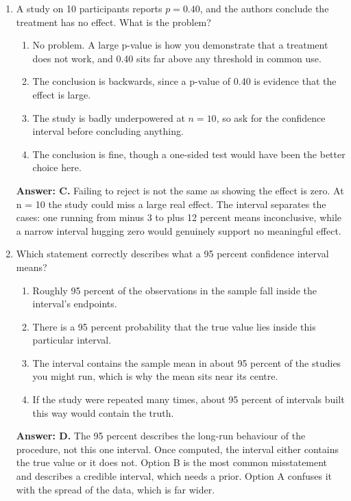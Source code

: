\documentclass[11pt]{article}
\begin{document}
\begin{enumerate}[itemsep=14pt]
\item A study on 10 participants reports $p = 0.40$, and the authors conclude the treatment has no effect. What is the problem?

\begin{enumerate}[label=\Alph*., itemsep=1pt, topsep=3pt]
  \item No problem. A large p-value is how you demonstrate that a treatment does not work, and 0.40 sits far above any threshold in common use.
  \item The conclusion is backwards, since a p-value of 0.40 is evidence that the effect is large.
  \item The study is badly underpowered at $n = 10$, so ask for the confidence interval before concluding anything.
  \item The conclusion is fine, though a one-sided test would have been the better choice here.
\end{enumerate}

\vspace{2pt}
\textbf{Answer: C.} Failing to reject is not the same as showing the effect is zero. At n = 10 the study could miss a large real effect. The interval separates the cases: one running from minus 3 to plus 12 percent means inconclusive, while a narrow interval hugging zero would genuinely support no meaningful effect.
\vspace{4pt}

\item Which statement correctly describes what a 95 percent confidence interval means?

\begin{enumerate}[label=\Alph*., itemsep=1pt, topsep=3pt]
  \item Roughly 95 percent of the observations in the sample fall inside the interval's endpoints.
  \item There is a 95 percent probability that the true value lies inside this particular interval.
  \item The interval contains the sample mean in about 95 percent of the studies you might run, which is why the mean sits near its centre.
  \item If the study were repeated many times, about 95 percent of intervals built this way would contain the truth.
\end{enumerate}

\vspace{2pt}
\textbf{Answer: D.} The 95 percent describes the long-run behaviour of the procedure, not this one interval. Once computed, the interval either contains the true value or it does not. Option B is the most common misstatement and describes a credible interval, which needs a prior. Option A confuses it with the spread of the data, which is far wider.
\vspace{4pt}


\end{enumerate}
\end{document}
